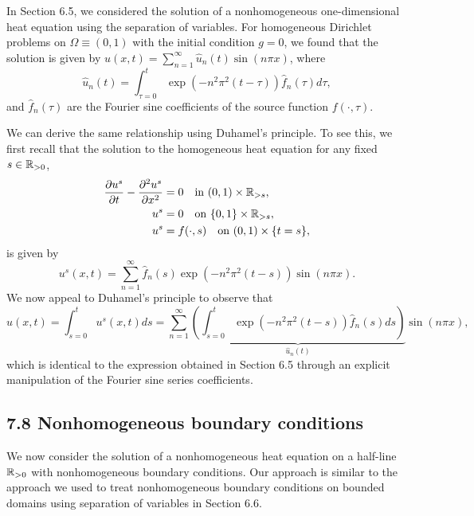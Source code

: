 \begin{example}
    In Section 6.5, we considered the solution of a nonhomogeneous one-dimensional heat equation using the separation of variables. For homogeneous Dirichlet problems on $\Omega \equiv (0, 1)$ with the initial condition $g = 0$, we found that the solution is given by $u(x, t) = \sum_{n=1}^{\infty} \hat{u}_n(t) \sin(n\pi x)$, where
    \[\hat{u}_n(t) = \int_{\tau=0}^{t} \exp(-n^2\pi^2(t - \tau)) \hat{f}_n(\tau) d\tau,\]
    and $\hat{f}_n(\tau)$ are the Fourier sine coefficients of the source function $f(\cdot, \tau)$.

    We can derive the same relationship using Duhamel's principle. To see this, we first recall that the solution to the homogeneous heat equation for any fixed $s \in \mathbb{R}_{>0}$,
    \begin{align*}
        \frac{\partial u^s}{\partial t} - \frac{\partial^2 u^s}{\partial x^2} &= 0 \quad \text{in } (0, 1) \times \mathbb{R}_{>s}, \\
        u^s &= 0 \quad \text{on } \{0, 1\} \times \mathbb{R}_{>s}, \\
        u^s &= f(\cdot, s) \quad \text{on } (0, 1) \times \{t = s\},
    \end{align*}
    is given by
    \[u^s(x, t) = \sum_{n=1}^{\infty} \hat{f}_n(s) \exp(-n^2\pi^2(t - s)) \sin(n\pi x).\]
    We now appeal to Duhamel's principle to observe that
    \[u(x, t) = \int_{s=0}^{t} u^s(x, t) ds = \sum_{n=1}^{\infty} \underbrace{\left(\int_{s=0}^{t} \exp(-n^2\pi^2(t - s)) \hat{f}_n(s) ds\right)}_{\hat{u}_n(t)} \sin(n\pi x),\]
    which is identical to the expression obtained in Section 6.5 through an explicit manipulation of the Fourier sine series coefficients.
\end{example}

\subsection{7.8 Nonhomogeneous boundary conditions}
We now consider the solution of a nonhomogeneous heat equation on a half-line $\mathbb{R}_{>0}$ with nonhomogeneous boundary conditions. Our approach is similar to the approach we used to treat nonhomogeneous boundary conditions on bounded domains using separation of variables in Section 6.6.

